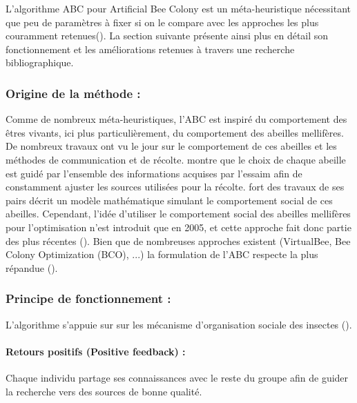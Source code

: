 L’algorithme ABC pour Artificial Bee Colony est un méta-heuristique nécessitant
que peu de paramètres à fixer si on le compare avec les approches les plus
couramment retenues().
La section suivante présente ainsi plus en détail son fonctionnement et les améliorations
retenues à travers une recherche bibliographique.



\subsubsection{Origine de la méthode :} %
\label{ssub:origine_de_la_méthode}
Comme de nombreux méta-heuristiques, l’ABC est inspiré du comportement des êtres
vivants, ici plus particulièrement, du comportement des abeilles mellifères. De nombreux
travaux ont vu le jour sur le comportement de ces abeilles et les méthodes de
communication et de récolte. \cite{Visscher19821790} montre que le choix de chaque abeille
est guidé par l’ensemble des informations acquises par l’essaim afin de constamment
ajuster les sources utilisées pour la récolte.
\cite{Camazine1991547} fort des travaux de ses pairs décrit un modèle mathématique
simulant le comportement social de ces abeilles.
Cependant, l’idée d’utiliser le comportement social des abeilles mellifères pour l’optimisation
n’est introduit que en 2005, et cette approche fait donc partie des plus récentes (\cite{Karaboga2005}).
Bien que de nombreuses approches existent (VirtualBee, Bee Colony Optimization (BCO), ...)
la formulation de l’ABC respecte la plus répandue (\cite{Karaboga201221}).


\subsubsection{Principe de fonctionnement :} %
\label{ssub:principe_de_fonctionnement}
L’algorithme s’appuie sur sur les mécanisme d’organisation sociale des insectes (\cite{Bonabeau1999}).
\paragraph{Retours positifs (Positive feedback) :} %
\label{par:positive_feedback}
Chaque individu partage ses connaissances avec le reste du groupe afin de guider
la recherche vers des sources de bonne qualité.

